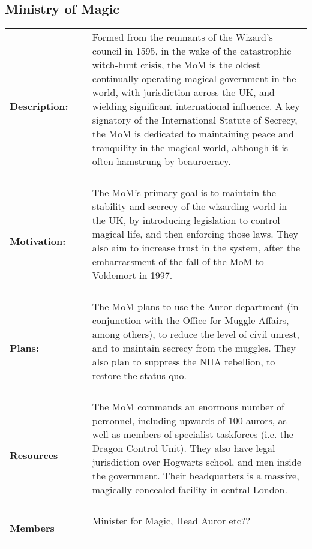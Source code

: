 \documentclass[oneside]{book}
\begin{document}
\subsection{Ministry of Magic}
\begin{longtable}{p{} p{} p{} }

\bf Description: & ~ &\parbox[t]{\q cm}{Formed from the remnants of the Wizard's council in 1595, in the wake of the catastrophic witch-hunt crisis, the MoM is the oldest continually operating magical government in the world, with jurisdiction across the UK, and wielding significant international influence. A key signatory of the International Statute of  Secrecy, the MoM is dedicated to maintaining peace and tranquility in the magical world, although it is often hamstrung by beaurocracy. \\~  } 
\\
\bf Motivation:	& ~ & \parbox[t]{\q cm}{ The MoM's primary goal is to maintain the stability and secrecy of the wizarding world in the UK, by introducing legislation to control magical life, and then enforcing those laws. They also aim to increase trust in the system, after the embarrassment of the fall of the MoM to Voldemort in 1997. \\~  } 
\\
\bf Plans:	& ~ & \parbox[t]{\q cm}{The MoM plans to use the Auror department (in conjunction with the Office for Muggle Affairs, among others), to reduce the level of civil unrest, and to maintain secrecy from the muggles. They also plan to suppress the NHA rebellion, to restore the status quo. \\~  } 
\\
\bf Resources & ~ & \parbox[t]{\q cm}{The MoM commands an enormous number of personnel, including upwards of 100 aurors, as well as members of specialist taskforces (i.e. the Dragon Control Unit). They also have legal jurisdiction over Hogwarts school, and men inside the government. Their headquarters is a massive, magically-concealed facility in central London. \\ ~ }
\\
\bf Members	& ~ &  \parbox[t]{\q cm}{Minister for Magic, Head Auror etc?? \\ ~ }

\end{longtable}
\end{document}
